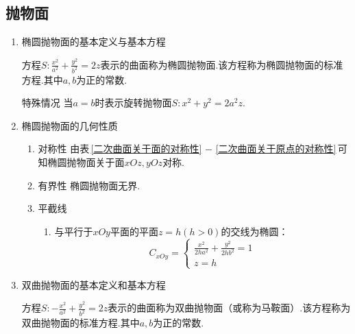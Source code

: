 \subsection{抛物面}\label{抛物线}
\sja
\begin{enumerate}
	\item 椭圆抛物面的基本定义与基本方程
	
	\enbelowdefination[椭圆抛物面]
	\kg 方程$\displaystyle S:\frac{x^2}{a^2}+\frac{y^2}{b^2}=2z$表示的曲面称为{\color{dy}椭圆抛物面}.该方程称为{\color{dy}椭圆抛物面的标准方程}.其中$a,b$为正的常数.
	\par {\color{dy}特殊情况}
	\kg 当$a=b$时表示{\color{dy}旋转抛物面}\label{旋转抛物面}$S: x^2+y^2=2a^2z.$
	
	\item 椭圆抛物面的几何性质
		\begin{enumerate}
		\setlength{\topsep}{0.01em}
		\setlength{\itemsep}{0.01em}
		
		\item 对称性 \kg 由表$\,$\ref{二次曲面关于面的对称性}  $-$ \ref{二次曲面关于原点的对称性}$\,$可知椭圆抛物面关于面$xOz,yOz$对称.
		
		\item 有界性 \kg 椭圆抛物面无界.
		
		\item 平截线
			\begin{enumerate}
			\setlength{\topsep}{0.01em}
			\setlength{\itemsep}{0.01em}
			\item 与平行于$xOy$平面的平面$z=h(h>0)$的交线为椭圆：
			\begin{equation*}
			C_{xOy}=
			\begin{cases}
			\displaystyle \frac{x^2}{2ha^2}+\frac{y^2}{2hb^2}=1\\
			z=h
			\end{cases}
			\end{equation*}
			\end{enumerate}
		\end{enumerate}

\item 双曲抛物面的基本定义和基本方程

\enbelowdefination[双曲抛物面]
	\kg 方程$\displaystyle S:-\frac{x^2}{a^2}+\frac{y^2}{b^2}=2z$表示的曲面称为{\color{dy}双曲抛物面}（或称为{\color{dy}马鞍面}）.该方程称为{\color{dy}双曲抛物面的标准方程}.其中$a,b$为正的常数.


\end{enumerate}
